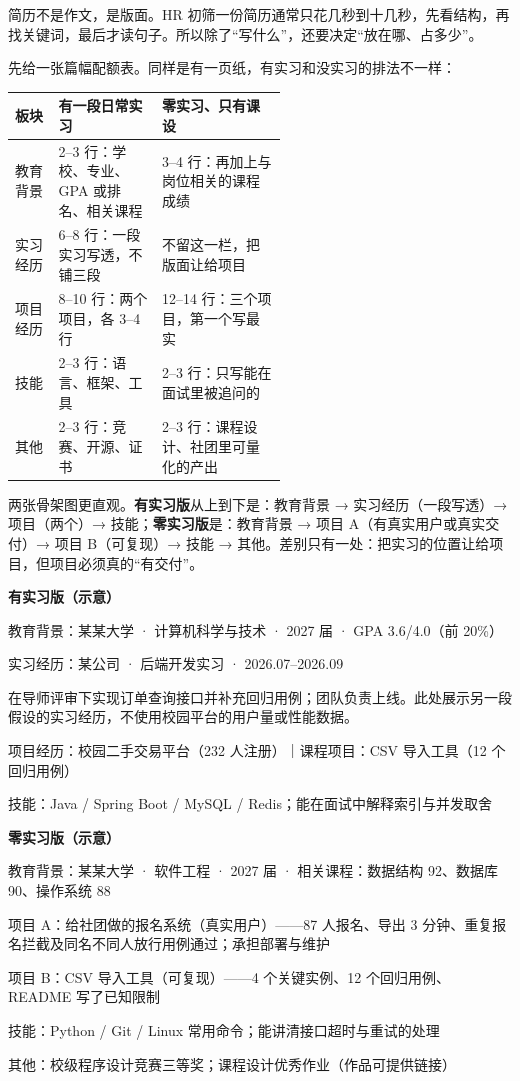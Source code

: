 \documentclass[UTF8,zihao=5,openany]{ctexbook}
\begin{document}
简历不是作文，是版面。HR 初筛一份简历通常只花几秒到十几秒，先看结构，再找关键词，最后才读句子。所以除了“写什么”，还要决定“放在哪、占多少”。

先给一张篇幅配额表。同样是有一页纸，有实习和没实习的排法不一样：

\begin{center}\small
\begin{tabularx}{\linewidth}{p{0.16\linewidth}p{0.38\linewidth}Y}
\toprule
板块 & 有一段日常实习 & 零实习、只有课设 \\
\midrule
教育背景 & 2--3 行：学校、专业、GPA 或排名、相关课程 & 3--4 行：再加上与岗位相关的课程成绩 \\
实习经历 & 6--8 行：一段实习写透，不铺三段 & 不留这一栏，把版面让给项目 \\
项目经历 & 8--10 行：两个项目，各 3--4 行 & 12--14 行：三个项目，第一个写最实 \\
技能 & 2--3 行：语言、框架、工具 & 2--3 行：只写能在面试里被追问的 \\
其他 & 2--3 行：竞赛、开源、证书 & 2--3 行：课程设计、社团里可量化的产出 \\
\bottomrule
\end{tabularx}
\end{center}

两张骨架图更直观。\textbf{有实习版}从上到下是：教育背景 → 实习经历（一段写透）→ 项目（两个）→ 技能；\textbf{零实习版}是：教育背景 → 项目 A（有真实用户或真实交付）→ 项目 B（可复现）→ 技能 → 其他。差别只有一处：把实习的位置让给项目，但项目必须真的“有交付”。

\begin{casebox}
\textbf{有实习版（示意）}

教育背景：某某大学 · 计算机科学与技术 · 2027 届 · GPA 3.6/4.0（前 20\%）

实习经历：某公司 · 后端开发实习 · 2026.07--2026.09

\hspace{1em}在导师评审下实现订单查询接口并补充回归用例；团队负责上线。此处展示另一段假设的实习经历，不使用校园平台的用户量或性能数据。

项目经历：校园二手交易平台（232 人注册）｜课程项目：CSV 导入工具（12 个回归用例）

技能：Java / Spring Boot / MySQL / Redis；能在面试中解释索引与并发取舍
\end{casebox}

\begin{casebox}
\textbf{零实习版（示意）}

教育背景：某某大学 · 软件工程 · 2027 届 · 相关课程：数据结构 92、数据库 90、操作系统 88

项目 A：给社团做的报名系统（真实用户）——87 人报名、导出 3 分钟、重复报名拦截及同名不同人放行用例通过；承担部署与维护

项目 B：CSV 导入工具（可复现）——4 个关键实例、12 个回归用例、README 写了已知限制

技能：Python / Git / Linux 常用命令；能讲清接口超时与重试的处理

其他：校级程序设计竞赛三等奖；课程设计优秀作业（作品可提供链接）
\end{casebox}
\end{document}
